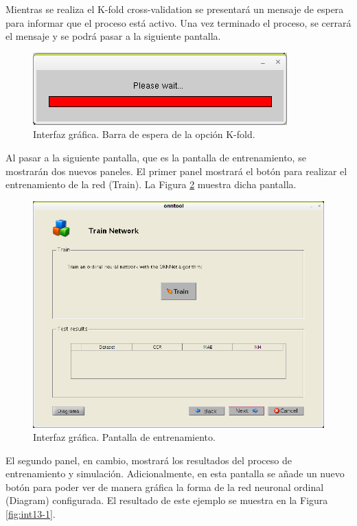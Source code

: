 		Mientras se realiza el K-fold cross-validation se presentará un mensaje de espera para informar que el proceso está activo. Una vez terminado el proceso, se cerrará el mensaje y se podrá pasar a la siguiente pantalla.\\
		
		\begin{figure}[htbp]
			\centering
			\includegraphics[scale=1]{interfaz/interface12-2.png}
			\caption{Interfaz gráfica. Barra de espera de la opción K-fold.}
			\label{fig:int12-2}
		\end{figure}
		
		Al pasar a la siguiente pantalla, que es la pantalla de entrenamiento, se mostrarán dos nuevos paneles. El primer panel mostrará el botón para realizar el entrenamiento de la red (Train). La Figura \ref{fig:int13} muestra dicha pantalla.\\
		
		\begin{figure}[htbp]
			\centering
			\includegraphics[scale=0.5]{interfaz/interface13.png}
			\caption{Interfaz gráfica. Pantalla de entrenamiento.}
			\label{fig:int13}
		\end{figure}
		
		El segundo panel, en cambio, mostrará los resultados del proceso de entrenamiento y simulación. Adicionalmente, en esta pantalla se añade un nuevo botón para poder ver de manera gráfica la forma de la red neuronal ordinal (Diagram) configurada. El resultado de este ejemplo se muestra en la Figura \ref{fig:int13-1}.\\
		
